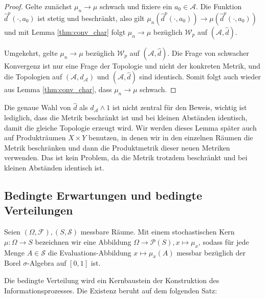\begin{proof}
    Gelte zunächst $\mu_n \rightarrow \mu$ schwach und fixiere ein $a_0 \in \mathcal{A}$. Die Funktion $\hat{d}^p(\cdot, a_0)$ ist stetig und beschränkt, also gilt $\mu_n(\hat{d}^p(\cdot, a_0)) \rightarrow \mu(\hat{d}^p(\cdot, a_0))$ und mit Lemma \ref{thm:conv_char} folgt $\mu_n \rightarrow \mu$ bezüglich $\mathcal{W}_p$ auf $(\mathcal{A}, \hat{d})$.

    Umgekehrt, gelte $\mu_n \rightarrow \mu$ bezüglich $\mathcal{W}_p$ auf $(\mathcal{A}, \hat{d})$. Die Frage von schwacher Konvergenz ist nur eine Frage der Topologie und nicht der konkreten Metrik, und die Topologien auf $(\mathcal{A}, d_\mathcal{A})$ und $(\mathcal{A}, \hat{d})$ sind identisch. Somit folgt auch wieder aus Lemma \ref{thm:conv_char}, dass $\mu_n \rightarrow \mu$ schwach.
\end{proof}
\begin{remark}
    Die genaue Wahl von $\hat{d}$ als $d_\mathcal{A} \wedge 1$ ist nicht zentral für den Beweis, wichtig ist lediglich, dass die Metrik beschränkt ist und bei kleinen Abständen identisch, damit die gleiche Topologie erzeugt wird. Wir werden dieses Lemma später auch auf Produkträumen $X \times Y$ benutzen, in denen wir in den einzelnen Räumen die Metrik beschränken und dann die Produktmetrik dieser neuen Metriken verwenden. Das ist kein Problem, da die Metrik trotzdem beschränkt und bei kleinen Abständen identisch ist.
\end{remark}
\subsection{Bedingte Erwartungen und bedingte Verteilungen}
\begin{definition}
Seien $(\Omega, \mathcal{F}), (S, \mathcal{S})$ messbare Räume. Mit einem stochastischen Kern $\mu:\Omega \rightarrow S$ bezeichnen wir eine Abbildung $\Omega \rightarrow \mathcal{P}(S), x\mapsto \mu_x$, sodass für jede Menge $A \in \mathcal{S}$ die Evaluations-Abbildung $x \mapsto \mu_x(A)$ messbar bezüglich der Borel $\sigma$-Algebra auf $[0,1]$ ist.
\end{definition}
Die bedingte Verteilung wird ein Kernbaustein der Konstruktion des Informationsprozesses. Die Existenz beruht auf dem folgenden Satz:

